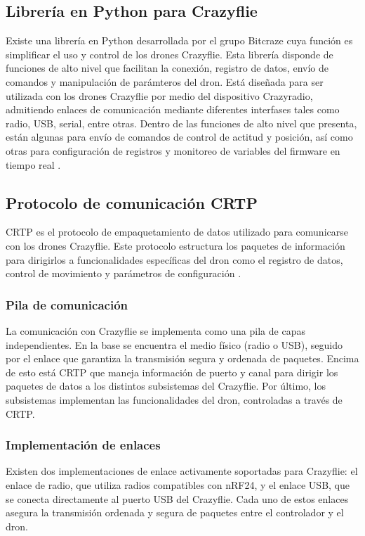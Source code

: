 \subsection*{Librería en Python para Crazyflie}
Existe una librería en Python desarrollada por el grupo Bitcraze cuya función es simplificar el uso y control de los drones Crazyflie. Esta librería disponde de funciones de alto nivel que facilitan la conexión, registro de datos, envío de comandos y manipulación de parámteros del dron. Está diseñada para ser utilizada con los drones Crazyflie por medio del dispositivo Crazyradio, admitiendo enlaces de comunicación mediante diferentes interfases tales como radio, USB, serial, entre otras. Dentro de las funciones de alto nivel que presenta, están algunas para envío de comandos de control de actitud y posición, así como otras para configuración de registros y monitoreo de variables del firmware en tiempo real \cite{Crazyflie_Python}. 

\subsection*{Protocolo de comunicación CRTP}
CRTP es el protocolo de empaquetamiento de datos utilizado para comunicarse con los drones Crazyflie. Este protocolo estructura los paquetes de información para dirigirlos a funcionalidades específicas del dron como el registro de datos, control de movimiento y parámetros de configuración \cite{Crazyflie_CRTP}. 

\subsubsection*{Pila de comunicación}
La comunicación con Crazyflie se implementa como una pila de capas independientes. En la base se encuentra el medio físico (radio o USB), seguido por el enlace que garantiza la transmisión segura y ordenada de paquetes. Encima de esto está CRTP que maneja información de puerto y canal para dirigir los paquetes de datos a los distintos subsistemas del Crazyflie. Por último, los subsistemas implementan las funcionalidades del dron, controladas a través de CRTP.

\subsubsection*{Implementación de enlaces}
Existen dos implementaciones de enlace activamente soportadas para Crazyflie: el enlace de radio, que utiliza radios compatibles con nRF24, y el enlace USB, que se conecta directamente al puerto USB del Crazyflie. Cada uno de estos enlaces asegura la transmisión ordenada y segura de paquetes entre el controlador y el dron.

